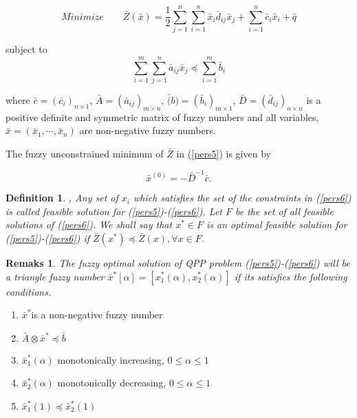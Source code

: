 \documentclass{iaesarticle3}
\newtheorem{definition}{Definition}
\newtheorem{rem}{Remaks}
\begin{document}
\begin{equation}\label{pers5}                                             %
    Minimize \qquad \bar{Z}(\bar{x}) = \frac{1}{2} \sum_{j=1}^n \sum_{i=1}^n \bar{x}_i \bar{d}_{ij} \bar{x}_j + \sum_{i=1}^n \bar{c}_i\bar{x}_i + \bar{q}
\end{equation}

\noindent subject to
\begin{equation}\label{pers6}                                              %
    \sum_{i=1}^m \sum_{j=1}^n \bar{a}_{ij} \bar{x}_j \preceq \sum_{i=1}^m \bar{b}_i
\end{equation}

\noindent where $\bar{c} = (\bar{c}_i)_{n \times 1}$, $\bar{A} = (\bar{a}_{ij})_{m \times n}$, $\bar(b) = (\bar{b}_i)_{m \times 1}$, $\bar{D} = (\bar{d}_{ij})_{n \times n}$ is a positive definite and symmetric matrix of fuzzy numbers and all variables, $\bar{x} = (\bar{x}_1, \cdots, \bar{x}_n)$ are non-negative fuzzy numbers.

The fuzzy unconstrained minimum of $\bar{Z}$ in (\ref{pers5}) is given by

\begin{equation}\label{pers7}
    \bar{x}^{(0)} = -\bar{D}^{-1} \bar{c}.
\end{equation}

\begin{definition}
      \emph{\cite{mal}}, Any set of $x_i$ which satisfies the set of the constraints in (\ref{pers6}) is called feasible solution for (\ref{pers5})-(\ref{pers6}). Let $F$ be the set  of all feasible solutions of (\ref{pers6}). We shall say that $x^* \in F$ is an optimal feasible solution for (\ref{pers5})-(\ref{pers6}) if $\bar{Z}(x^*) \preceq \bar{Z}(x),  \forall x \in F$.
\end{definition}

\begin{rem}
    The fuzzy optimal solution of QPP problem (\ref{pers5})-(\ref{pers6}) will be a triangle fuzzy number $\bar{x}^*[\alpha] = [x_1^*(\alpha), x_2^*(\alpha)]$ if its satisfies the following conditions.
\end{rem}

\begin{enumerate}
  \item $\bar{x}^* $is a non-negative fuzzy number
  \item $\bar{A}\otimes \bar{x}^* \preceq \bar{b}$
  \item $\bar{x}_1^*(\alpha)$ monotonically increasing, $0 \leq \alpha \leq 1$
  \item $\bar{x}_2^*(\alpha)$ monotonically decreasing, $0 \leq \alpha \leq 1$
  \item $\bar{x}_1^*(1) \preceq \bar{x}_2^*(1)$
\end{enumerate}
\end{document}
